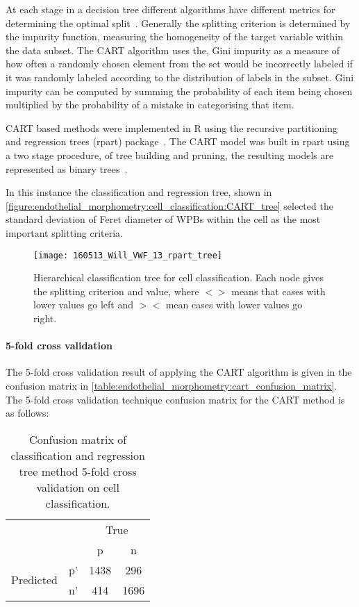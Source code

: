 At each stage in a decision tree different algorithms have different metrics for determining the optimal split~\cite{Rokach2005}. Generally the splitting criterion is determined by the impurity function, measuring the homogeneity of the target variable within the data subset. The CART algorithm uses the, Gini impurity as a measure of how often a randomly chosen element from the set would be incorrectly labeled if it was randomly labeled according to the distribution of labels in the subset. Gini impurity can be computed by summing the probability of each item being chosen multiplied by the probability of a mistake in categorising that item.

CART based methods were implemented in R using the recursive partitioning and regression trees (rpart) package~\cite{Therneau2015}. The CART model was built in rpart using a two stage procedure, of tree building and pruning, the resulting models are represented as binary trees~\cite{Duda2000}.

In this instance the classification and regression tree, shown in \autoref{figure:endothelial_morphometry:cell_classification:CART_tree} selected the standard deviation of Feret diameter of WPBs within the cell as the most important splitting criteria.

\begin{figure}[htbp!]
	\centering
	\texttt{[image: 160513\_Will\_VWF\_13\_rpart\_tree]}
	\caption[CART hierarchical tree]{Hierarchical classification tree for cell classification. Each node gives the splitting criterion and value, where $<>$ means that cases with lower values go left and $><$ mean cases with lower values go right.}
	\label{figure:endothelial_morphometry:cell_classification:CART_tree}
\end{figure}

\paragraph{5-fold cross validation}
The 5-fold cross validation result of applying the CART algorithm is given in the confusion matrix in \autoref{table:endothelial_morphometry:cart_confusion_matrix}.
The 5-fold cross validation technique confusion matrix for the CART method is as follows:

\begin{table}[htbp]
\caption[Confusion matrix of CART cross validation on cell classification]{Confusion matrix of classification and regression tree method 5-fold cross validation on cell classification.}
\label{table:endothelial_morphometry:cart_confusion_matrix}
\centering
\begin{tabular}{cc|cc}
	\multicolumn{2}{c}{}&\multicolumn{2}{c}{True}\\
	\multicolumn{2}{c|}{}& p & n\\
	\cline{2-4}
	\multirow{2}{*}{Predicted}& p' & 1438 & 296\\ & n' & 414 & 1696\\
\end{tabular}
\end{table}

